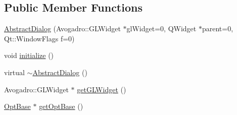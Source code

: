 \subsection*{Public Member Functions}
\begin{DoxyCompactItemize}
\item 
\hyperlink{classGlobalSearch_1_1AbstractDialog_a44af0af55038d330e284d3ddc567dd3f}{Abstract\-Dialog} (Avogadro\-::\-G\-L\-Widget $\ast$gl\-Widget=0, Q\-Widget $\ast$parent=0, Qt\-::\-Window\-Flags f=0)
\item 
void \hyperlink{classGlobalSearch_1_1AbstractDialog_aea19edd77198f2e6155002f53a61add6}{initialize} ()
\item 
virtual \hyperlink{classGlobalSearch_1_1AbstractDialog_a55ebf148332cc0eca585e816bda871ae}{$\sim$\-Abstract\-Dialog} ()
\item 
Avogadro\-::\-G\-L\-Widget $\ast$ \hyperlink{classGlobalSearch_1_1AbstractDialog_a4823851b13319cd2a4384c00346faf22}{get\-G\-L\-Widget} ()
\item 
\hyperlink{classGlobalSearch_1_1OptBase}{Opt\-Base} $\ast$ \hyperlink{classGlobalSearch_1_1AbstractDialog_ad2fe5c3c110152b29207b54df72dbd45}{get\-Opt\-Base} ()
\end{DoxyCompactItemize}
